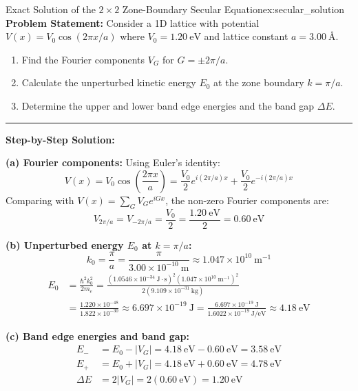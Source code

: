 \documentclass[11pt,a4paper]{article}
\begin{document}
\vspace{0.4cm}

\begin{examplebox}{Exact Solution of the $2\times 2$ Zone-Boundary Secular Equation}{ex:secular_solution}
\textbf{Problem Statement:}
Consider a 1D lattice with potential $V(x) = V_0 \cos(2\pi x/a)$ where $V_0 = 1.20\ \mathrm{eV}$ and lattice constant $a = 3.00\ \text{\AA}$.
\begin{enumerate}[label=(\alph*)]
    \item Find the Fourier components $V_G$ for $G = \pm 2\pi/a$.
    \item Calculate the unperturbed kinetic energy $E_0$ at the zone boundary $k = \pi/a$.
    \item Determine the upper and lower band edge energies and the band gap $\Delta E$.
\end{enumerate}

\vspace{0.2cm}\hrule\vspace{0.2cm}
\textbf{Step-by-Step Solution:}

\textbf{(a) Fourier components:}
Using Euler's identity:
\[
V(x) = V_0 \cos\left(\frac{2\pi x}{a}\right) = \frac{V_0}{2}e^{i(2\pi/a)x} + \frac{V_0}{2}e^{-i(2\pi/a)x}
\]
Comparing with $V(x) = \sum_G V_G e^{i G x}$, the non-zero Fourier components are:
\[
V_{2\pi/a} = V_{-2\pi/a} = \frac{V_0}{2} = \frac{1.20\ \mathrm{eV}}{2} = \mathbf{0.60\ \mathrm{eV}}
\]

\textbf{(b) Unperturbed energy $E_0$ at $k = \pi/a$:}
\[
k_0 = \frac{\pi}{a} = \frac{\pi}{3.00 \times 10^{-10}\ \mathrm{m}} \approx 1.047 \times 10^{10}\ \mathrm{m^{-1}}
\]
\begin{align*}
E_0 &= \frac{\hbar^2 k_0^2}{2m_e} = \frac{(1.0546 \times 10^{-34}\ \mathrm{J\cdot s})^2 (1.047 \times 10^{10}\ \mathrm{m^{-1}})^2}{2(9.109 \times 10^{-31}\ \mathrm{kg})} \\
&= \frac{1.220 \times 10^{-48}}{1.822 \times 10^{-30}} \approx 6.697 \times 10^{-19}\ \mathrm{J} = \frac{6.697 \times 10^{-19}\ \mathrm{J}}{1.6022 \times 10^{-19}\ \mathrm{J/eV}} \approx \mathbf{4.18\ \mathrm{eV}}
\end{align*}

\textbf{(c) Band edge energies and band gap:}
\begin{align*}
E_- &= E_0 - |V_G| = 4.18\ \mathrm{eV} - 0.60\ \mathrm{eV} = \mathbf{3.58\ \mathrm{eV}} \\
E_+ &= E_0 + |V_G| = 4.18\ \mathrm{eV} + 0.60\ \mathrm{eV} = \mathbf{4.78\ \mathrm{eV}} \\
\Delta E &= 2|V_G| = 2(0.60\ \mathrm{eV}) = \mathbf{1.20\ \mathrm{eV}}
\end{align*}
\end{examplebox}
\end{document}
